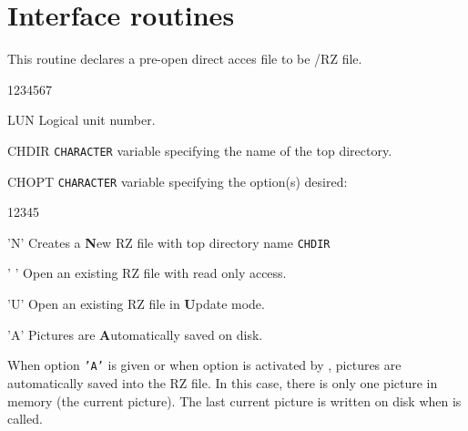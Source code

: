 \section{Interface routines}
\Action
This routine declares a pre-open direct acces file to be \ZEBRA/RZ file.
\Pdesc
\begin{DLtt}{1234567}
\item[LUN]   Logical unit number.
\item[CHDIR] {\tt CHARACTER} variable specifying the name of the top directory.
\item[CHOPT] {\tt CHARACTER} variable specifying the option(s) desired:
\begin{DLtt}{12345}
   \item['N'] Creates a {\bf N}ew RZ file with top directory name {\tt CHDIR}
   \item[' '] Open an existing RZ file with read only access.
   \item['U'] Open an existing RZ file in {\bf U}pdate mode.
   \item['A'] Pictures are {\bf A}utomatically saved on disk.
\end{DLtt}
\end{DLtt}
When option {\tt'A'} is given or when option  is activated by 
, pictures are automatically saved into the RZ file. In this case,
there is only one picture in memory (the current picture). The last current 
picture is written on disk when  is called.
 

